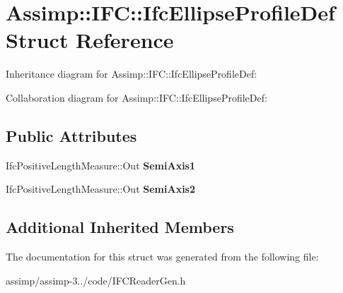 \hypertarget{struct_assimp_1_1_i_f_c_1_1_ifc_ellipse_profile_def}{\section{Assimp\+:\+:I\+F\+C\+:\+:Ifc\+Ellipse\+Profile\+Def Struct Reference}
\label{struct_assimp_1_1_i_f_c_1_1_ifc_ellipse_profile_def}
}


Inheritance diagram for Assimp\+:\+:I\+F\+C\+:\+:Ifc\+Ellipse\+Profile\+Def\+:


Collaboration diagram for Assimp\+:\+:I\+F\+C\+:\+:Ifc\+Ellipse\+Profile\+Def\+:
\subsection*{Public Attributes}
\begin{DoxyCompactItemize}
\item 
\hypertarget{struct_assimp_1_1_i_f_c_1_1_ifc_ellipse_profile_def_a98d5a6f0ba6792dab1e5021e9411c53a}{Ifc\+Positive\+Length\+Measure\+::\+Out {\bfseries Semi\+Axis1}}\label{struct_assimp_1_1_i_f_c_1_1_ifc_ellipse_profile_def_a98d5a6f0ba6792dab1e5021e9411c53a}

\item 
\hypertarget{struct_assimp_1_1_i_f_c_1_1_ifc_ellipse_profile_def_a91d0473aa5c280e35f2e48eb003be466}{Ifc\+Positive\+Length\+Measure\+::\+Out {\bfseries Semi\+Axis2}}\label{struct_assimp_1_1_i_f_c_1_1_ifc_ellipse_profile_def_a91d0473aa5c280e35f2e48eb003be466}

\end{DoxyCompactItemize}
\subsection*{Additional Inherited Members}


The documentation for this struct was generated from the following file\+:\begin{DoxyCompactItemize}
\item 
assimp/assimp-\/3../code/I\+F\+C\+Reader\+Gen.\+h\end{DoxyCompactItemize}
